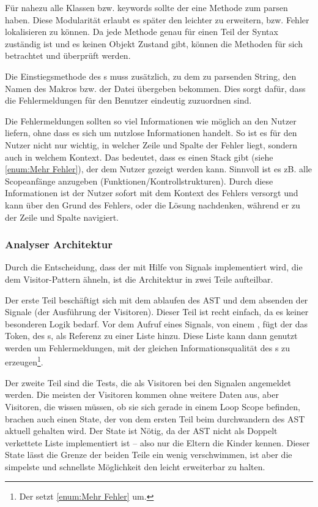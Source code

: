       Für nahezu alle  Klassen bzw. keywords sollte der  eine Methode zum parsen haben. Diese Modularität erlaubt es später den  leichter zu erweitern, bzw. Fehler lokalisieren zu können. Da jede Methode genau für einen Teil der Syntax zuständig ist und es keinen Objekt Zustand gibt, können die Methoden für sich betrachtet und überprüft werden.

      Die Einstiegsmethode des s muss zusätzlich, zu dem zu parsenden String, den Namen des Makros bzw. der Datei übergeben bekommen. Dies sorgt dafür, dass die Fehlermeldungen für den Benutzer eindeutig zuzuordnen sind.

      Die Fehlermeldungen sollten so viel Informationen wie möglich an den Nutzer liefern, ohne dass es sich um nutzlose Informationen handelt. So ist es für den Nutzer nicht nur wichtig, in welcher Zeile und Spalte der Fehler liegt, sondern auch in welchem Kontext. Das bedeutet, dass es einen Stack gibt (siehe \ref{enum:Mehr Fehler}), der dem Nutzer gezeigt werden kann. Sinnvoll ist es zB. alle Scopeanfänge anzugeben (Funktionen/Kontrollstrukturen). Durch diese Informationen ist der Nutzer sofort mit dem Kontext des Fehlers versorgt und kann über den Grund des Fehlers, oder die Lösung  nachdenken, während er zu der Zeile und Spalte navigiert.

    \subsubsection{Analyser Architektur}
    \label{sssec:Analyser Architektur}
      Durch die Entscheidung, dass der  mit Hilfe von Signals implementiert wird, die dem Visitor-Pattern ähneln, ist die Architektur in zwei Teile aufteilbar.

      Der erste Teil beschäftigt sich mit dem ablaufen des AST und dem absenden der Signale (der Ausführung der Visitoren). Dieser Teil ist recht einfach, da es keiner besonderen Logik bedarf. Vor dem Aufruf eines Signals, von einem , fügt der  das Token, des s, als Referenz zu einer Liste hinzu. Diese Liste kann dann genutzt werden um Fehlermeldungen, mit der gleichen Informationsqualität des s zu erzeugen\footnote{
        Der  setzt \ref{enum:Mehr Fehler} um.
      }.

      Der zweite Teil sind die Tests, die als Visitoren bei den Signalen angemeldet werden. Die meisten der Visitoren kommen ohne weitere Daten aus, aber Visitoren, die wissen müssen, ob sie sich gerade in einem Loop Scope befinden, brachen auch einen State, der von dem ersten Teil beim durchwandern des AST aktuell gehalten wird. Der State ist Nötig, da der AST nicht als Doppelt verkettete Liste implementiert ist -- also nur die Eltern die Kinder kennen. Dieser State lässt die Grenze der beiden Teile ein wenig verschwimmen, ist aber die simpelste und schnellste Möglichkeit den  leicht erweiterbar zu halten.


